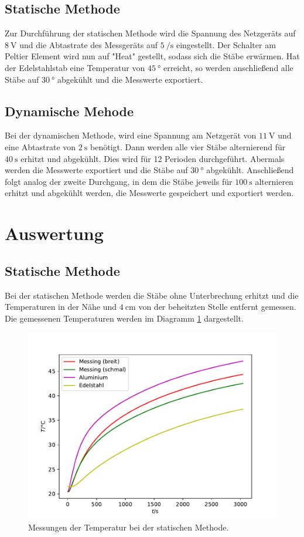 \subsection{Statische Methode}
Zur Durchführung der statischen Methode wird die Spannung des Netzgeräts auf $\SI{8}{\volt}$ und die
Abtastrate des Messgeräts auf $\SI{5}{\per \second}$ eingestellt. Der Schalter am Peltier Element wird
nun auf "Heat" gestellt, sodass sich die Stäbe erwärmen. Hat der Edelstahlstab eine Temperatur
von $\SI{45}{\degree}$ erreicht, so werden anschließend alle Stäbe auf $\SI{30}{\degree}$ abgekühlt
und die Messwerte exportiert.

\subsection{Dynamische Mehode}
Bei der dynamischen Methode, wird eine Spannung am Netzgerät von $\SI{11}{\volt}$ und
eine Abtastrate von $\SI{2}{\second}$ benötigt. Dann werden alle vier Stäbe alternierend
für $\SI{40}{\second}$ erhitzt und abgekühlt. Dies wird für 12 Perioden durchgeführt.
Abermals werden die Messwerte exportiert und die Stäbe auf $\SI{30}{\degree}$
abgekühlt. Anschließend folgt analog der zweite Durchgang, in dem die Stäbe jeweils für
$\SI{100}{\second}$ alternieren erhitzt und abgekühlt werden, die Messwerte gespeichert und exportiert werden.


\section{Auswertung}

\subsection{Statische Methode}
Bei der statischen Methode werden die Stäbe ohne Unterbrechung erhitzt und die Temperaturen in der
Nähe und $\SI{4}{\centi\meter}$ von der beheitzten Stelle entfernt gemessen.
Die gemessenen Temperaturen werden im Diagramm \ref{Abb:1} dargestellt.

\begin{figure}
  \centering
  \includegraphics[scale = 0.7]{plotA.pdf}
  \caption{Messungen der Temperatur bei der statischen Methode.}
  \label{Abb:1}
\end{figure}


